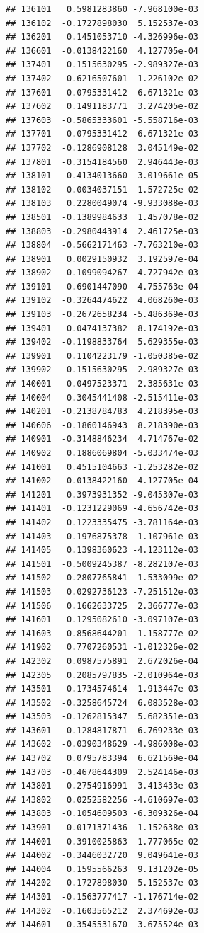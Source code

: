 \documentclass[ignorenonframetext,]{beamer}
\begin{document}
\begin{frame}[fragile]
\begin{verbatim}
## 136101   0.5981283860 -7.968100e-03
## 136102  -0.1727898030  5.152537e-03
## 136201   0.1451053710 -4.326996e-03
## 136601  -0.0138422160  4.127705e-04
## 137401   0.1515630295 -2.989327e-03
## 137402   0.6216507601 -1.226102e-02
## 137601   0.0795331412  6.671321e-03
## 137602   0.1491183771  3.274205e-02
## 137603  -0.5865333601 -5.558716e-03
## 137701   0.0795331412  6.671321e-03
## 137702  -0.1286908128  3.045149e-02
## 137801  -0.3154184560  2.946443e-03
## 138101   0.4134013660  3.019661e-05
## 138102  -0.0034037151 -1.572725e-02
## 138103   0.2280049074 -9.933088e-03
## 138501  -0.1389984633  1.457078e-02
## 138803  -0.2980443914  2.461725e-03
## 138804  -0.5662171463 -7.763210e-03
## 138901   0.0029150932  3.192597e-04
## 138902   0.1099094267 -4.727942e-03
## 139101  -0.6901447090 -4.755763e-04
## 139102  -0.3264474622  4.068260e-03
## 139103  -0.2672658234 -5.486369e-03
## 139401   0.0474137382  8.174192e-03
## 139402  -0.1198833764  5.629355e-03
## 139901   0.1104223179 -1.050385e-02
## 139902   0.1515630295 -2.989327e-03
## 140001   0.0497523371 -2.385631e-03
## 140004   0.3045441408 -2.515411e-03
## 140201  -0.2138784783  4.218395e-03
## 140606  -0.1860146943  8.218390e-03
## 140901  -0.3148846234  4.714767e-02
## 140902   0.1886069804 -5.033474e-03
## 141001   0.4515104663 -1.253282e-02
## 141002  -0.0138422160  4.127705e-04
## 141201   0.3973931352 -9.045307e-03
## 141401  -0.1231229069 -4.656742e-03
## 141402   0.1223335475 -3.781164e-03
## 141403  -0.1976875378  1.107961e-03
## 141405   0.1398360623 -4.123112e-03
## 141501  -0.5009245387 -8.282107e-03
## 141502  -0.2807765841  1.533099e-02
## 141503   0.0292736123 -7.251512e-03
## 141506   0.1662633725  2.366777e-03
## 141601   0.1295082610 -3.097107e-03
## 141603  -0.8568644201  1.158777e-02
## 141902   0.7707260531 -1.012326e-02
## 142302   0.0987575891  2.672026e-04
## 142305   0.2085797835 -2.010964e-03
## 143501   0.1734574614 -1.913447e-03
## 143502  -0.3258645724  6.083528e-03
## 143503  -0.1262815347  5.682351e-03
## 143601  -0.1284817871  6.769233e-03
## 143602  -0.0390348629 -4.986008e-03
## 143702   0.0795783394  6.621569e-04
## 143703  -0.4678644309  2.524146e-03
## 143801  -0.2754916991 -3.413433e-03
## 143802   0.0252582256 -4.610697e-03
## 143803  -0.1054609503 -6.309326e-04
## 143901   0.0171371436  1.152638e-03
## 144001  -0.3910025863  1.777065e-02
## 144002  -0.3446032720  9.049641e-03
## 144004   0.1595566263  9.131202e-05
## 144202  -0.1727898030  5.152537e-03
## 144301  -0.1563777417 -1.176714e-02
## 144302  -0.1603565212  2.374692e-03
## 144601   0.3545531670 -3.675524e-03

\end{verbatim}
\end{frame}
\end{document}
